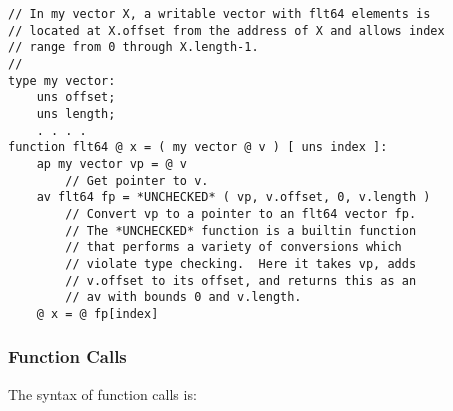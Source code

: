 \documentclass[12pt]{article}
\newenvironment{indpar}[1][0.3in]%
	{\begin{list}{}%
		     {\setlength{\itemsep}{0in}%
		      \setlength{\topsep}{0in}%
		      \setlength{\parsep}{1ex}%
		      \setlength{\labelwidth}{#1}%
		      \setlength{\leftmargin}{#1}%
		      \addtolength{\leftmargin}{\labelsep}}%
	 \item}%
	{\end{list}}
\begin{document}
\begin{indpar}\begin{verbatim}
// In my vector X, a writable vector with flt64 elements is
// located at X.offset from the address of X and allows index
// range from 0 through X.length-1.
//
type my vector:
    uns offset;
    uns length;
    . . . .
function flt64 @ x = ( my vector @ v ) [ uns index ]:
    ap my vector vp = @ v
        // Get pointer to v.
    av flt64 fp = *UNCHECKED* ( vp, v.offset, 0, v.length )
        // Convert vp to a pointer to an flt64 vector fp.
        // The *UNCHECKED* function is a builtin function
        // that performs a variety of conversions which
        // violate type checking.  Here it takes vp, adds
        // v.offset to its offset, and returns this as an
        // av with bounds 0 and v.length.
    @ x = @ fp[index]
\end{verbatim}\end{indpar}

\subsubsection{Function Calls}
\label{FUNCTION-CALLS}

The syntax of function calls is:
\end{document}
